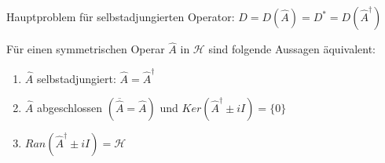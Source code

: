 Hauptproblem für selbstadjungierten Operator: $D = D(\hat{A}) = D^\ast = D(\hat{A}^\dagger)$

\begin{Satz}
    Für einen symmetrischen Operar $\hat{A}$ in $\mathcal{H}$ sind folgende Aussagen äquivalent:
    \begin{enumerate}[label=(\alph*)]
        \item $\hat{A}$ selbstadjungiert: $\hat{A} = \hat{A}^\dagger$
        \item $\hat{A}$ abgeschlossen $\left( \overline{\hat{A}} = \hat{A} \right)$ und
                $Ker(\hat{A}^\dagger \pm iI) = \{0\}$
        \item $Ran(\hat{A}^\dagger \pm iI) = \mathcal{H}$
    \end{enumerate}
\end{Satz}

